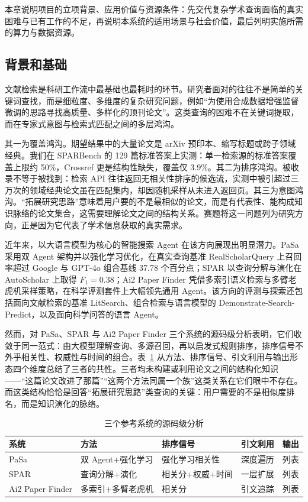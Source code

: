 \documentclass[12pt,a4paper]{ctexart}
\begin{document}
本章说明项目的立项背景、应用价值与资源条件：先交代复杂学术查询面临的真实困难与已有工作的不足，再说明本系统的适用场景与社会价值，最后列明实施所需的算力与数据资源。

\subsection{背景和基础}

文献检索是科研工作流中最基础也最耗时的环节。研究者面对的往往不是简单的关键词查找，而是细粒度、多维度的复杂研究问题，例如“为使用合成数据增强监督微调的思路寻找高质量、多样化的顶刊论文”。这类查询的困难不在关键词提取，而在专家式意图与检索式匹配之间的多层鸿沟。

其一为覆盖鸿沟。期望结果中的大量论文是 arXiv 预印本、缩写标题或跨子领域经典。我们在 SPARBench 的 129 篇标准答案上实测：单一检索源的标准答案覆盖上限约 50\%，Crossref 更是结构性缺失，覆盖仅 3.9\%。其二为排序鸿沟。被收录不等于被找到：检索 API 往往返回无相关性排序的候选流，实测中被引超过三万次的领域经典论文虽在匹配集内，却因随机采样从未进入返回页。其三为意图鸿沟。“拓展研究思路”意味着用户要的不是最相似的论文，而是有代表性、能构成知识脉络的论文集合，这需要理解论文之间的结构关系。赛题将这一问题列为研究方向，正是因为它代表了学术信息获取的真实需求。

近年来，以大语言模型为核心的智能搜索 Agent 在该方向展现出明显潜力。PaSa 采用双 Agent 架构并以强化学习优化，在真实查询基准 RealScholarQuery 上召回率超过 Google 与 GPT-4o 组合基线 37.78 个百分点\cite{pasa}；SPAR 以查询分解与演化在 AutoScholar 上取得 $F_1=0.38$\cite{spar}；Ai2 Paper Finder 凭借多索引语义检索与多臂老虎机采样策略，在科学评测套件上大幅领先通用 Agent\cite{asta}。该方向的评测与探索还包括面向文献检索的基准 LitSearch\cite{litsearch}、组合检索与语言模型的 Demonstrate-Search-Predict\cite{dsp}，以及面向科学问答的语言 Agent\cite{skarlinski}。

然而，对 PaSa、SPAR 与 Ai2 Paper Finder 三个系统的源码级分析表明，它们收敛于同一范式：由大模型理解查询、多源召回，再以启发式规则排序，排序信号不外乎相关性、权威性与时间的组合。表~\ref{tab:ref} 从方法、排序信号、引文利用与输出形态四个维度总结了三者的共性。三者均未构建或利用论文之间的结构化知识——“这篇论文改进了那篇”“这两个方法同属一个族”这类关系在它们眼中不存在。而这类结构恰恰是回答“拓展研究思路”类查询的关键：用户需要的不是相似度排名，而是知识演化的脉络。

\begin{table}[htbp]
\centering
\small
\caption{三个参考系统的源码级分析}
\label{tab:ref}
\begin{tabularx}{\textwidth}{l X X X X}
\toprule
系统 & 方法 & 排序信号 & 引文利用 & 输出 \tabularnewline
\midrule
PaSa & 双 Agent+强化学习 & 强化学习相关性 & 深度遍历 & 列表 \tabularnewline
SPAR & 查询分解+演化 & 相关分+权威+时间 & 一层扩展 & 列表 \tabularnewline
Ai2 Paper Finder & 多索引+多臂老虎机 & 相关分 & 引文追踪 & 列表 \tabularnewline
\bottomrule
\end{tabularx}
\end{table}
\end{document}

